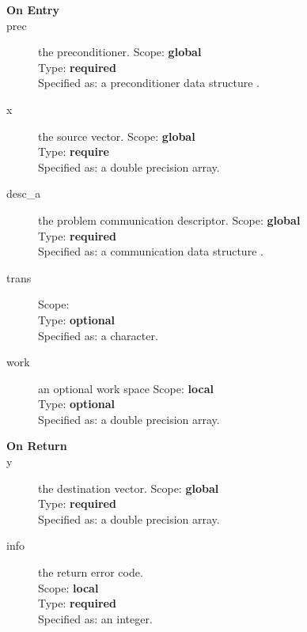 \begin{description}
\item[\bf On Entry]
\item[prec] the preconditioner.
Scope: {\bf global} \\
Type: {\bf required}\\
Specified as: a preconditioner data structure \precdata.
\item[x] the source vector.
Scope: {\bf global} \\
Type: {\bf require}\\
Specified as: a double precision array.
\item[desc\_a] the problem communication descriptor.
Scope: {\bf global} \\
Type: {\bf required}\\
Specified as: a communication data structure \descdata.
\item[trans] 
Scope: {\bf } \\
Type: {\bf optional}\\
Specified as: a character.
\item[work] an optional work space
Scope: {\bf local} \\
Type: {\bf optional}\\
Specified as: a double precision array.
\end{description}

\begin{description}
\item[\bf On Return]
\item[y] the destination vector.
Scope: {\bf global} \\
Type: {\bf required}\\
Specified as: a double precision array.
\item[info] the return error code.\\
Scope: {\bf local} \\
Type: {\bf required}\\
Specified as: an integer.\\
\end{description}



